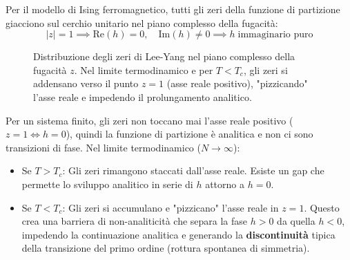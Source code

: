 \begin{tcolorbox}[colback=yellow!25, colframe=yellow!75!orange, coltitle=black, title=\textbf{Teorema del Cerchio (Lee-Yang)}]
Per il modello di Ising ferromagnetico, tutti gli zeri della funzione di partizione giacciono sul cerchio unitario nel piano complesso della fugacità:
\begin{equation}
|z| = 1 \implies \text{Re}(h) = 0, \quad \text{Im}(h) \neq 0 \implies h \; \text{immaginario puro}
\end{equation}
\end{tcolorbox}


\begin{figure}[h]
    \centering
    \caption{Distribuzione degli zeri di Lee-Yang nel piano complesso della fugacità $z$. Nel limite termodinamico e per $T < T_c$, gli zeri si addensano verso il punto $z=1$ (asse reale positivo), "pizzicando" l'asse reale e impedendo il prolungamento analitico.}
    \label{fig:lee_yang}
\end{figure}

\noindent Per un sistema finito, gli zeri non toccano mai l'asse reale positivo ($z=1 \iff h=0$), quindi la funzione di partizione è analitica e non ci sono transizioni di fase.
Nel limite termodinamico ($N \to \infty$):
\begin{itemize}
    \item Se $T > T_c$: Gli zeri rimangono staccati dall'asse reale. Esiste un gap che permette lo sviluppo analitico in serie di $h$ attorno a $h=0$.
    \item Se $T < T_c$: Gli zeri si accumulano e "pizzicano" l'asse reale in $z=1$. Questo crea una barriera di non-analiticità che separa la fase $h>0$ da quella $h<0$, impedendo la continuazione analitica e generando la \textbf{discontinuità} tipica della transizione del primo ordine (rottura spontanea di simmetria).
\end{itemize}

